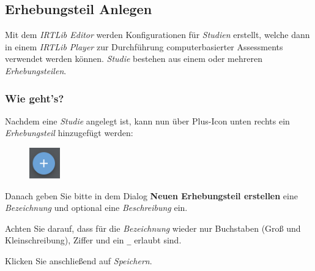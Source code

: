 \documentclass[
  letterpaper,
  DIV=11]{scrreprt}
\begin{document}
\begin{tcolorbox}[enhanced jigsaw, colbacktitle=quarto-callout-tip-color!10!white, coltitle=black, colframe=quarto-callout-tip-color-frame, leftrule=.75mm, breakable, opacitybacktitle=0.6, toprule=.15mm, title=\textcolor{quarto-callout-tip-color}{\faLightbulb}\hspace{0.5em}{Eingebettete Programmhilfe}, colback=white, titlerule=0mm, arc=.35mm, bottomtitle=1mm, toptitle=1mm, rightrule=.15mm, bottomrule=.15mm, left=2mm, opacityback=0]

\hypertarget{erhebungsteil-anlegen-1}{%
\subsection{Erhebungsteil Anlegen}\label{erhebungsteil-anlegen-1}}

Mit dem \emph{IRTLib Editor} werden Konfigurationen für \emph{Studien}
erstellt, welche dann in einem \emph{IRTLib Player} zur Durchführung
computerbasierter Assessments verwendet werden können. \emph{Studie}
bestehen aus einem oder mehreren \emph{Erhebungsteilen}.

\hypertarget{wie-gehts-1}{%
\subsubsection{Wie geht's?}\label{wie-gehts-1}}

Nachdem eine \emph{Studie} angelegt ist, kann nun über Plus-Icon unten
rechts ein \emph{Erhebungsteil} hinzugefügt werden:

\begin{figure}[H]

\includegraphics[width=0.52083in,height=\textheight]{img/icon-plus.png} \hfill{}

\end{figure}

Danach geben Sie bitte in dem Dialog \textbf{Neuen Erhebungsteil
erstellen} eine \emph{Bezeichnung} und optional eine \emph{Beschreibung}
ein.

Achten Sie darauf, dass für die \emph{Bezeichnung} wieder nur Buchstaben
(Groß und Kleinschreibung), Ziffer und ein \texttt{\_} erlaubt sind.

Klicken Sie anschließend auf \emph{Speichern}.

\begin{figure}[H]


\end{figure}
\end{tcolorbox}
\end{document}
